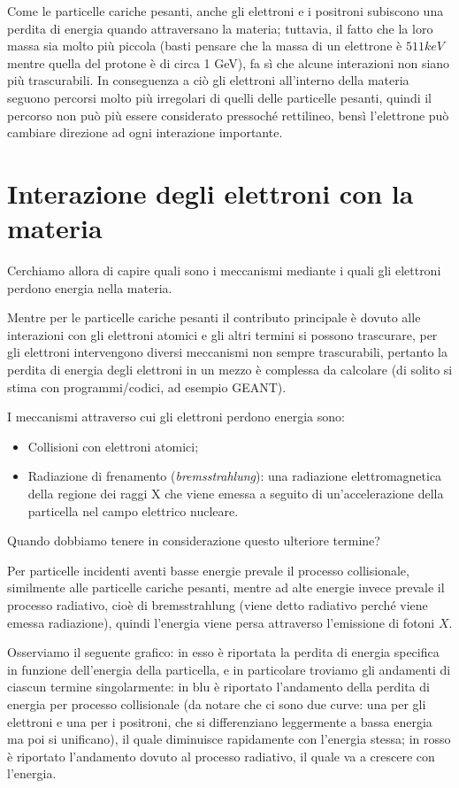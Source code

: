 Come le particelle cariche pesanti, anche gli elettroni e i positroni subiscono una perdita di energia quando attraversano la materia; tuttavia, il fatto che la loro massa sia molto più piccola (basti pensare che la massa di un elettrone è $511 keV$ mentre quella del protone è di circa 1 GeV), fa sì che alcune interazioni non siano più trascurabili. In conseguenza a ciò gli elettroni all'interno della materia seguono percorsi molto più irregolari di quelli delle particelle pesanti, quindi il percorso non può più essere considerato pressoché rettilineo, bensì l'elettrone può cambiare direzione ad ogni interazione importante.

\section{Interazione degli elettroni con la materia}

Cerchiamo allora di capire quali sono i meccanismi mediante i quali gli elettroni perdono energia nella materia.

Mentre per le particelle cariche pesanti il contributo principale è dovuto alle interazioni con gli elettroni atomici e gli altri termini si possono trascurare, per gli elettroni intervengono diversi meccanismi non sempre trascurabili, pertanto la perdita di energia degli elettroni in un mezzo è complessa da calcolare (di solito si stima con programmi/codici, ad esempio GEANT).

I meccanismi attraverso cui gli elettroni perdono energia sono:

\begin{itemize}
    \item Collisioni con elettroni atomici;
    \item Radiazione di frenamento (\textit{bremsstrahlung}): una radiazione elettromagnetica della regione dei raggi X che viene emessa a seguito di un'accelerazione della particella nel campo elettrico nucleare.
\end{itemize}

Quando dobbiamo tenere in considerazione questo ulteriore termine?

Per particelle incidenti aventi basse energie prevale il processo collisionale, similmente alle particelle cariche pesanti, mentre ad alte energie invece prevale il processo radiativo, cioè di bremsstrahlung (viene detto radiativo perché viene emessa radiazione), quindi l'energia viene persa attraverso l'emissione di fotoni $X$.

Osserviamo il seguente grafico: in esso è riportata la perdita di energia specifica in funzione dell'energia della particella, e in particolare troviamo gli andamenti di ciascun termine singolarmente: in blu è riportato l'andamento della perdita di energia per processo collisionale (da notare che ci sono due curve: una per gli elettroni e una per i positroni, che si differenziano leggermente a bassa energia ma poi si unificano), il quale diminuisce rapidamente con l'energia stessa; in rosso è riportato l'andamento dovuto al processo radiativo, il quale va a crescere con l'energia.

